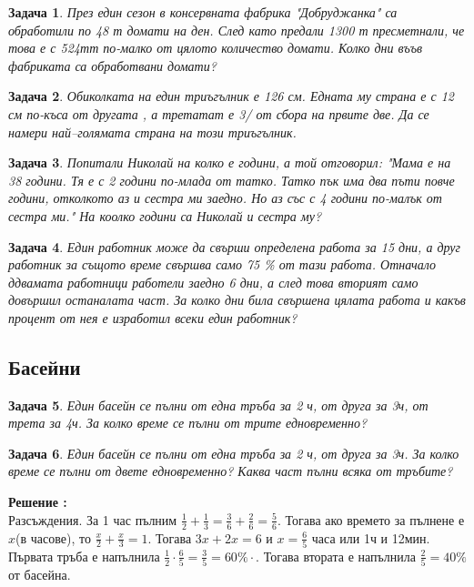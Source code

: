 \documentclass{article}
\newtheorem{problem}{Задача}
\newcounter{solution}
\newcommand\solution{%
	\stepcounter{solution}%
	\textbf{Решение :}\\%
}
\begin{document}
\begin{problem}
	През един сезон в консервната фабрика "Добруджанка" са обработили по 48 т домати на ден. След като предали 1300 т пресметнали, че това е с 524тт по-малко от цялото количество домати. Колко дни въъв фабриката са обработвани домати?
\end{problem}


\begin{problem}
	Обиколката на един триъгълник е 126 см. Едната му страна е с 12 см по-къса от другата , а третатат е 3/ от сбора на првите две. Да се намери най--голямата страна на този триъгълник.
\end{problem}


\begin{problem}
	Попитали Николай на колко е години, а той отговорил: "Мама е на 38 години. Тя е с 2 години по-млада от татко. Татко пък има два пъти повче години, отколкото аз и сестра ми заедно. Но аз със с 4 години по-малък от сестра ми." На коолко години са Николай и сестра му?
\end{problem}


\begin{problem}
	Един работник може да свърши определена работа за 15 дни, а друг работник за същото време свършва само 75 \% от тази работа. Отначало ддвамата  работници работели заедно 6 дни, а след това вторият само довършил останалата част. За колко дни била свършена цялата работа и какъв процент от нея е изработил всеки един работник?
\end{problem}

\subsection{Басейни}

\begin{problem}
	Един басейн се пълни от една тръба за 2 ч, от друга за 3ч, от трета за 4ч. За колко време се пълни от трите едновременно? 
\end{problem}


\begin{problem}
	Един басейн се пълни от една тръба за 2 ч, от друга за 3ч. За колко време се пълни от двете едновременно? Каква част пълни всяка от тръбите?
\end{problem}

\solution
Разсъждения. За 1 час пълним $\frac{1}{2} + \frac{1}{3} = \frac{3}{6} + \frac{2}{6} = \frac{5}{6}$. Тогава ако времето за пълнене е $x$(в часове), то $\frac{x}{2} + \frac{x}{3} = 1 $. Тогава $3x + 2x = 6 $ и  $ x = \frac{6}{5}$ часа или 1ч и 12мин. Първата тръба е напълнила $\frac{1}{2}\cdot \frac{6}{5} = \frac{3}{5} = 60\% \cdot $. Тогава втората е напълнила $\frac{2}{5} = 40\%$ от басейна.
 
\end{document}
